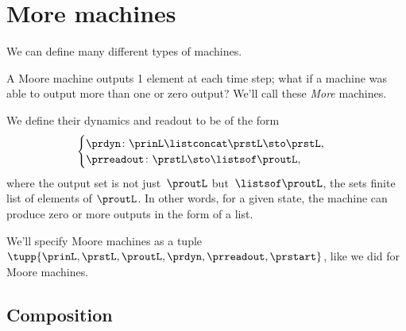 
\section{More machines}
\label{sec:more-machines}

We can define many different types of machines.

A Moore machine outputs 1 element at each time step; what if a machine was able to output more than one or zero output? We'll call these \emph{More} machines. 

We define their dynamics and readout to be of the form
%
\begin{equation}
    \label{eq:more-signature}
    \begin{cases}
        \prdyn \colon  \prinL \listconcat \prstL \sto \prstL, \\
        \prreadout \colon \prstL  \sto \listsof \proutL,
    \end{cases}
\end{equation}
%
where the output set is not just~$\proutL$ but~$\listsof \proutL$, the sets finite list of elements of $\proutL$. In other words, for a given state, the machine can produce zero or more outputs in the form of a list. 


We'll specify Moore machines as a tuple $\tupp{\prinL,\prstL,\proutL,\prdyn,\prreadout,\prstart}$, like we did for Moore machines. 


\subsection{Composition}

